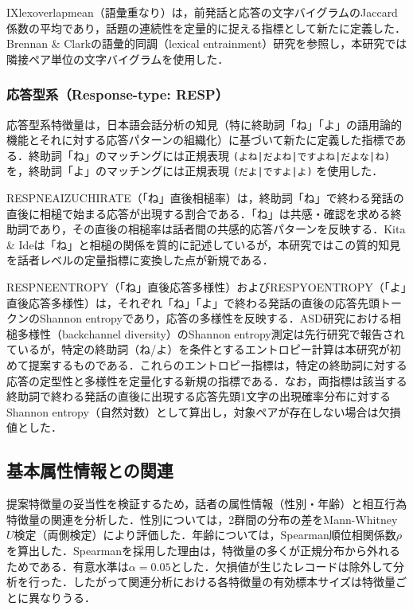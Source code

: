 \documentclass[dvipdfmx,11pt,a4paper]{bxjsarticle}
\renewcommand{\_}{\paperorigunderscore\allowbreak}%
\begin{document}
IX\_lex\_overlap\_mean（語彙重なり）は，前発話と応答の文字バイグラムのJaccard係数の平均であり，話題の連続性を定量的に捉える指標として新たに定義した．Brennan \& Clark\cite{brennan1996}の語彙的同調（lexical entrainment）研究を参照し，本研究では隣接ペア単位の文字バイグラムを使用した．

\subsubsection{応答型系（Response-type: RESP）}
応答型系特徴量は，日本語会話分析の知見（特に終助詞「ね」「よ」の語用論的機能とそれに対する応答パターンの組織化）に基づいて新たに定義した指標である．終助詞「ね」のマッチングには正規表現 \texttt{(よね|だよね|ですよね|だよな|ね)} を，終助詞「よ」のマッチングには正規表現 \texttt{(だよ|ですよ|よ)} を使用した．

RESP\_NE\_AIZUCHI\_RATE（「ね」直後相槌率）は，終助詞「ね」で終わる発話の直後に相槌で始まる応答が出現する割合である．「ね」は共感・確認を求める終助詞であり，その直後の相槌率は話者間の共感的応答パターンを反映する．Kita \& Ide\cite{kita2007}は「ね」と相槌の関係を質的に記述しているが，本研究ではこの質的知見を話者レベルの定量指標に変換した点が新規である．

RESP\_NE\_ENTROPY（「ね」直後応答多様性）およびRESP\_YO\_ENTROPY（「よ」直後応答多様性）は，それぞれ「ね」「よ」で終わる発話の直後の応答先頭トークンのShannon entropyであり，応答の多様性を反映する．ASD研究における相槌多様性（backchannel diversity）のShannon entropy測定は先行研究で報告されているが\cite{wehrle2024}，特定の終助詞（ね/よ）を条件とするエントロピー計算は本研究が初めて提案するものである．これらのエントロピー指標は，特定の終助詞に対する応答の定型性と多様性を定量化する新規の指標である．なお，両指標は該当する終助詞で終わる発話の直後に出現する応答先頭1文字の出現確率分布に対するShannon entropy（自然対数）として算出し，対象ペアが存在しない場合は欠損値とした．


\subsection{基本属性情報との関連}
\label{sec:pred_demographic}

提案特徴量の妥当性を検証するため，話者の属性情報（性別・年齢）と相互行為特徴量の関連を分析した．性別については，2群間の分布の差をMann-Whitney $U$検定（両側検定）により評価した．年齢については，Spearman順位相関係数$\rho$を算出した．Spearmanを採用した理由は，特徴量の多くが正規分布から外れるためである．有意水準は$\alpha = 0.05$とした．欠損値が生じたレコードは除外して分析を行った．したがって関連分析における各特徴量の有効標本サイズは特徴量ごとに異なりうる．
\end{document}
